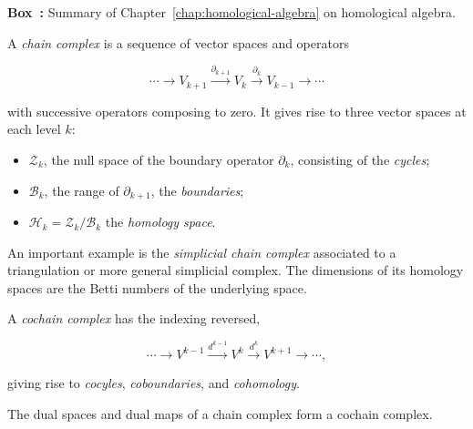 \begin{tcolorbox}[enhanced,breakable,colback=KuangNei,frame hidden,boxrule=0pt,sharpish corners,before skip=10pt,after skip=10pt]
\label{box:homological-algebra-summary}
\noindent\textbf{Box~\thebooksummary:} {Summary of Chapter~\ref{chap:homological-algebra} on homological algebra.}\par

{A \emph{chain complex} is a sequence of vector spaces and operators}

\[
\cdots\to V_{k+1}\xrightarrow{\partial_{k+1}}V_k\xrightarrow{\partial_k}V_{k-1}\to\cdots
\]

{with successive operators composing to zero. It gives rise to three vector spaces at each level $k$:}
\begin{itemize}
\item {$\mathcal Z_k$, the null space of the boundary operator $\partial_k$, consisting of the \emph{cycles};}
\item {$\mathcal B_k$, the range of $\partial_{k+1}$, the \emph{boundaries};}
\item {$\mathcal H_k=\mathcal Z_k/\mathcal B_k$ the \emph{homology space}.}
\end{itemize}

{An important example is the \emph{simplicial chain complex} associated to a triangulation or more general simplicial complex. The dimensions of its homology spaces are the Betti numbers of the underlying space.}

{A \emph{cochain complex} has the indexing reversed,}

\[
\cdots\to V^{k-1}\xrightarrow{d^{k-1}}V^k\xrightarrow{d^k}V^{k+1}\to\cdots,
\]

{giving rise to \emph{cocyles}, \emph{coboundaries}, and \emph{cohomology}.}

{The dual spaces and dual maps of a chain complex form a cochain complex.}


\end{tcolorbox}

